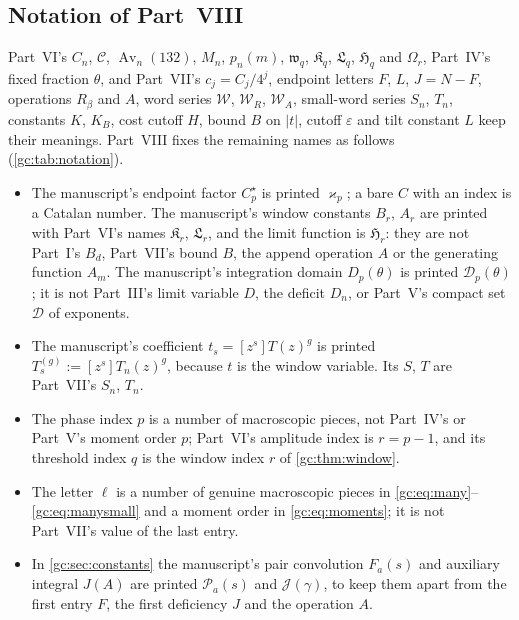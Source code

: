 \documentclass[11pt,a4paper]{article}
\theoremstyle{definition}\newaliascnt{definition}{theorem}
\theoremstyle{remark}\newaliascnt{remark}{theorem}
\newcommand{\Av}{\operatorname{Av}}
\newcommand{\Cat}{\mathcal C}
\begin{document}
\subsection{Notation of Part~VIII}
\label{gc:sec:notation}
Part~VI's $C_n$, $\Cat$, $\Av_n(132)$, $M_n$, $p_n(m)$, $\mathfrak w_q$,
$\mathfrak K_q$, $\mathfrak L_q$, $\mathfrak H_q$ and $\Omega_r$, Part~IV's
fixed fraction $\theta$, and Part~VII's $c_j=C_j/4^j$, endpoint letters $F$,
$L$, $J=N-F$, operations $R_\beta$ and $A$, word series $\mathcal W$,
$\mathcal W_R$, $\mathcal W_A$, small-word series $S_n$, $T_n$, constants $K$,
$K_B$, cost cutoff $H$, bound $B$ on $|t|$, cutoff $\varepsilon$ and tilt
constant $L$ keep their meanings. Part~VIII fixes the remaining names as follows
(\cref{gc:tab:notation}).
\begin{itemize}
\item The manuscript's endpoint factor $C_p^\star$ is printed $\varkappa_p$; a
 bare $C$ with an index is a Catalan number. The manuscript's window constants
 $B_r$, $A_r$ are printed with Part~VI's names $\mathfrak K_r$,
 $\mathfrak L_r$, and the limit function is $\mathfrak H_r$: they are not
 Part~I's $B_d$, Part~VII's bound $B$, the append operation $A$ or the
 generating function $A_m$. The manuscript's integration domain $D_p(\theta)$
 is printed $\mathcal D_p(\theta)$; it is not Part~III's limit variable $D$,
 the deficit $D_n$, or Part~V's compact set $\mathcal D$ of exponents.
\item The manuscript's coefficient $t_s=[z^s]T(z)^g$ is printed
 $T^{(g)}_s:=[z^s]T_n(z)^g$, because $t$ is the window variable. Its $S$, $T$
 are Part~VII's $S_n$, $T_n$.
\item The phase index $p$ is a number of macroscopic pieces, not Part~IV's or
 Part~V's moment order $p$; Part~VI's amplitude index is $r=p-1$, and its
 threshold index $q$ is the window index $r$ of \cref{gc:thm:window}.
\item The letter $\ell$ is a number of genuine macroscopic pieces in
 \eqref{gc:eq:many}--\eqref{gc:eq:manysmall} and a moment order in
 \eqref{gc:eq:moments}; it is not Part~VII's value of the last entry.
\item In \cref{gc:sec:constants} the manuscript's pair convolution $F_a(s)$ and
 auxiliary integral $J(A)$ are printed $\mathcal P_a(s)$ and
 $\mathcal J(\gamma)$, to keep them apart from the first entry $F$, the first
 deficiency $J$ and the operation $A$.
\end{itemize}
\end{document}
